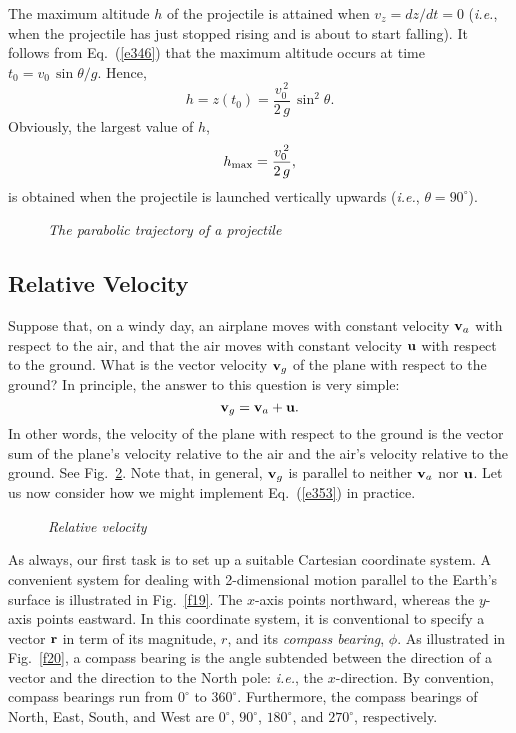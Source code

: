 The maximum altitude $h$ of the projectile is attained when
$v_z=dz/dt=0$ ({\em i.e.}, when the projectile has just stopped rising and
is about to start falling). It follows from Eq.~(\ref{e346}) that the maximum altitude
occurs at time $t_0=v_0\,\sin\theta/g$. Hence,
\begin{equation}
h = z(t_0)= \frac{v_0^{\,2}}{2\,g}\,\sin^2\theta.
\end{equation}
Obviously, the largest value of $h$,
\begin{equation}
h_{\rm max} = \frac{v_0^{\,2}}{2\,g},
\end{equation}
is obtained when the projectile is launched vertically upwards
({\em i.e.}, $\theta =90^\circ$).

\begin{figure}
\epsfysize=2in
\centerline{}
\caption{\em The parabolic trajectory of a projectile}\label{f17}   
\end{figure}

\subsection{Relative Velocity}
Suppose that, on a windy day, an airplane moves with constant velocity ${\bf v}_a$ with respect to the
air, and that the air moves with constant velocity ${\bf u}$ with
respect to the ground. What is the vector velocity ${\bf v}_g$ of the plane
with respect to the ground? In principle, the answer to this question is
very simple: 
\begin{equation}
{\bf v}_g = {\bf v}_a + {\bf u}.\label{e353}
\end{equation}
In other words, the velocity of the plane with respect to the ground is
the vector sum of the plane's velocity relative to the air and the air's
velocity relative to the ground. See Fig.~\ref{f18}. Note that, in general, ${\bf v}_g$ 
is parallel to neither  ${\bf v}_a$ nor ${\bf u}$. Let us now consider how we might
implement Eq.~(\ref{e353}) in practice.

\begin{figure}
\epsfysize=1.5in
\centerline{}
\caption{\em Relative velocity}\label{f18}   
\end{figure}

As always, our first task is to set up a suitable Cartesian coordinate system.
A convenient system for dealing with  2-dimensional motion parallel to the Earth's surface
is illustrated in Fig.~\ref{f19}. The $x$-axis points northward, whereas the $y$-axis points
eastward. In this coordinate system, it is conventional to specify a vector ${\bf r}$ in
term of its magnitude, $r$, and its {\em compass bearing}, $\phi$. As illustrated in Fig.~\ref{f20},
a compass bearing is the angle subtended between the direction of a vector and the direction to
the North  pole: {\em i.e.}, the $x$-direction. By convention, compass bearings
run from $0^\circ$ to $360^\circ$. Furthermore, the compass bearings of North, East, South, and West
are $0^\circ$, $90^\circ$, $180^\circ$, and $270^\circ$, respectively.

